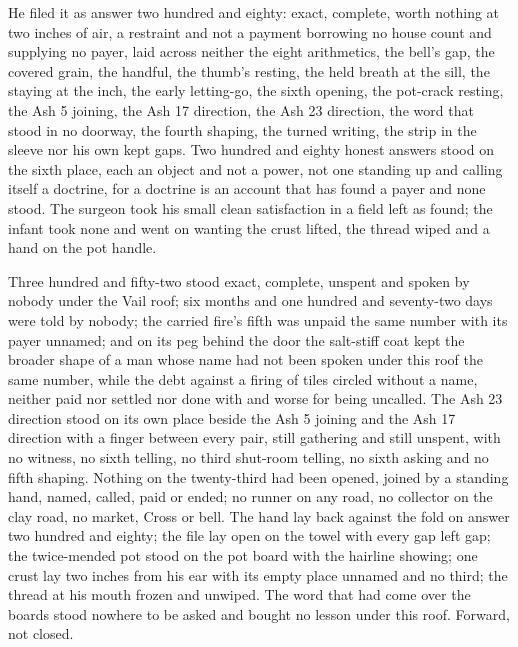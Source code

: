 He filed it as answer two hundred and eighty: exact, complete, worth nothing at two inches of air, a restraint and not a payment borrowing no house count and supplying no payer, laid across neither the eight arithmetics, the bell's gap, the covered grain, the handful, the thumb's resting, the held breath at the sill, the staying at the inch, the early letting-go, the sixth opening, the pot-crack resting, the Ash 5 joining, the Ash 17 direction, the Ash 23 direction, the word that stood in no doorway, the fourth shaping, the turned writing, the strip in the sleeve nor his own kept gaps. Two hundred and eighty honest answers stood on the sixth place, each an object and not a power, not one standing up and calling itself a doctrine, for a doctrine is an account that has found a payer and none stood. The surgeon took his small clean satisfaction in a field left as found; the infant took none and went on wanting the crust lifted, the thread wiped and a hand on the pot handle.

Three hundred and fifty-two stood exact, complete, unspent and spoken by nobody under the Vail roof; six months and one hundred and seventy-two days were told by nobody; the carried fire's fifth was unpaid the same number with its payer unnamed; and on its peg behind the door the salt-stiff coat kept the broader shape of a man whose name had not been spoken under this roof the same number, while the debt against a firing of tiles circled without a name, neither paid nor settled nor done with and worse for being uncalled. The Ash 23 direction stood on its own place beside the Ash 5 joining and the Ash 17 direction with a finger between every pair, still gathering and still unspent, with no witness, no sixth telling, no third shut-room telling, no sixth asking and no fifth shaping. Nothing on the twenty-third had been opened, joined by a standing hand, named, called, paid or ended; no runner on any road, no collector on the clay road, no market, Cross or bell. The hand lay back against the fold on answer two hundred and eighty; the file lay open on the towel with every gap left gap; the twice-mended pot stood on the pot board with the hairline showing; one crust lay two inches from his ear with its empty place unnamed and no third; the thread at his mouth frozen and unwiped. The word that had come over the boards stood nowhere to be asked and bought no lesson under this roof. Forward, not closed.
